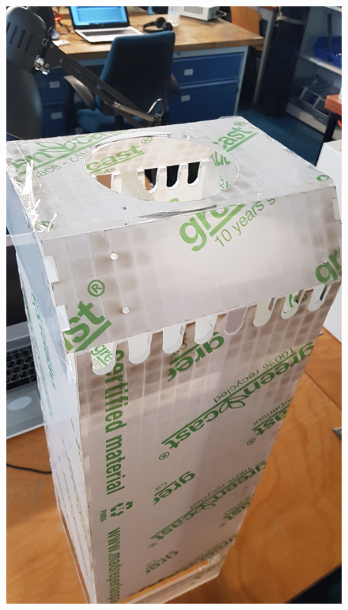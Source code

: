 \begin{figure}[H]
\centering
\begin{minipage}{.5\textwidth}
  \centering
  \includegraphics[width=\linewidth,angle = 270]{images/mywork/Sprint1/PMMAAssembled.jpg}
  \label{fig:pmmaass1}
\end{minipage}%
\begin{minipage}{.5\textwidth}
  \centering

\end{minipage}
\end{figure}
